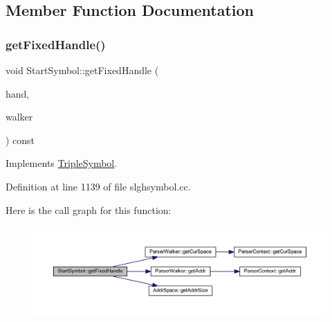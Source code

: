 \subsection{Member Function Documentation}
\mbox{\label{class_start_symbol_addda2db4266dfadb0158a6a305edff69}} 
\subsubsection{\texorpdfstring{getFixedHandle()}{getFixedHandle()}}
{\footnotesize\ttfamily void Start\+Symbol\+::get\+Fixed\+Handle (\begin{DoxyParamCaption}\item[{\mbox{\hyperlink{struct_fixed_handle}{Fixed\+Handle}} \&}]{hand,  }\item[{\mbox{\hyperlink{class_parser_walker}{Parser\+Walker}} \&}]{walker }\end{DoxyParamCaption}) const\hspace{0.3cm}{\ttfamily [virtual]}}



Implements \mbox{\hyperlink{class_triple_symbol_aa71f48c79a2bee73e97fdfb8163b4e46}{Triple\+Symbol}}.



Definition at line 1139 of file slghsymbol.\+cc.

Here is the call graph for this function\+:
\nopagebreak
\begin{figure}[H]
\begin{center}
\leavevmode
\includegraphics[width=350pt]{class_start_symbol_addda2db4266dfadb0158a6a305edff69_cgraph}
\end{center}
\end{figure}
\mbox{\label{class_start_symbol_aeeb32a702943ac0da1178cdf97e7002f}} 
